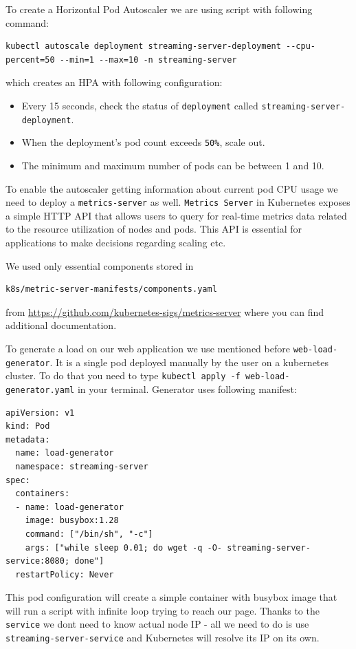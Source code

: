 \documentclass{article}
\begin{document}
To create a Horizontal Pod Autoscaler we are using script with following
command:

{\small
\begin{verbatim}
kubectl autoscale deployment streaming-server-deployment --cpu-percent=50 --min=1 --max=10 -n streaming-server
\end{verbatim}
}

which creates an HPA with following configuration:
\begin{itemize}
  \item Every 15 seconds, check the status of \texttt{deployment} called \texttt{streaming-server-deployment}.
  \item When the deployment's pod count exceeds \texttt{50\%}, scale out.
  \item The minimum and maximum number of pods can be between 1 and 10.
\end{itemize}


To enable the autoscaler getting information about current pod CPU usage
we need to deploy a \texttt{metrics-server} as well.
\texttt{Metrics\ Server} in Kubernetes exposes a simple HTTP API that
allows users to query for real-time metrics data related to the resource
utilization of nodes and pods. This API is essential for applications to
make decisions regarding scaling etc.

We used only essential components stored in

\begin{verbatim}
k8s/metric-server-manifests/components.yaml
\end{verbatim}

from \href{metrics server github}{https://github.com/kubernetes-sigs/metrics-server} where you can
find additional documentation.

To generate a load on our web application we use mentioned before
\texttt{web-load-generator}. It is a single pod deployed manually by the
user on a kubernetes cluster. To do that you need to type
\newline\texttt{kubectl\ apply\ -f\ web-load-generator.yaml} in your terminal.
\newline Generator uses following manifest:
\begin{verbatim}
apiVersion: v1
kind: Pod
metadata:
  name: load-generator
  namespace: streaming-server
spec:
  containers:
  - name: load-generator
    image: busybox:1.28
    command: ["/bin/sh", "-c"]
    args: ["while sleep 0.01; do wget -q -O- streaming-server-service:8080; done"]
  restartPolicy: Never
\end{verbatim}
This pod configuration will create a simple container with busybox image
that will run a script with infinite loop trying to reach our page.
Thanks to the \texttt{service} we dont need to know actual node IP - all
we need to do is use \texttt{streaming-server-service} and Kubernetes
will resolve its IP on its own.
\end{document}
